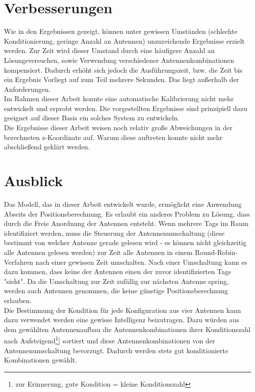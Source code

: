 %
\section{Verbesserungen}
%
Wie in den Ergebnissen gezeigt, können unter gewissen Umständen (schlechte Konditionierung, geringe Anzahl an Antennen) unzureichende Ergebnisse erzielt werden. Zur Zeit wird dieser Umstand durch eine häufigere Anzahl an Lösungsversuchen, sowie Verwendung verschiedener Antennenkombinationen kompensiert. Dadurch erhöht sich jedoch die Ausführungszeit, bzw. die Zeit bis ein Ergebnis Vorliegt auf zum Teil mehrere Sekunden. Das liegt außerhalb der Anforderungen. \\
%
Im Rahmen dieser Arbeit konnte eine automatische Kalibrierung nicht mehr entwickelt und erprobt werden. Die vorgestellten Ergebnisse sind prinzipiell dazu geeignet auf dieser Basis ein solches System zu entwickeln.\\

Die Ergebnisse dieser Arbeit weisen noch relativ große Abweichungen in der berechneten z-Koordinate auf. Warum diese auftreten konnte nicht mehr abschließend geklärt werden.
%
\section{Ausblick}
%
Das Modell, das in dieser Arbeit entwickelt wurde, ermöglicht eine Anwendung Abseits der Positionsberechnung. Es erlaubt ein anderes Problem zu Lösung, dass durch die Freie Anordnung der Antennen entsteht. Wenn mehrere Tags im Raum identifiziert werden, muss die Steuerung der Antennenumschaltung (diese bestimmt von welcher Antenne gerade gelesen wird - es können nicht gleichzeitig alle Antennen gelesen werden) zur Zeit alle Antennen in einem Round-Robin-Verfahren nach einer gewissen Zeit umschalten. Nach einer Umschaltung kann es dazu kommen, dass keine der Antennen einen der zuvor identifizierten Tags "sieht". Da die Umschaltung zur Zeit zufällig zur nächsten Antenne spring, werden auch Antennen genommen, die keine günstige Positionsberechnung erlauben.\\
Die Bestimmung der Kondition für jede Konfiguration aus vier Antennen kann dazu verwendet werden eine gewisse Intelligenz beizutragen. Dazu würden aus dem gewählten Antennenaufbau die Antennenkombinationen ihrer Konditionszahl nach Aufsteigend\footnote{zur Erinnerung, gute Kondition = kleine Konditionszahl}] sortiert und diese Antennenkombinationen von der Antennenumschaltung bevorzugt. Dadurch werden stets gut konditionierte Kombinationen gewählt.